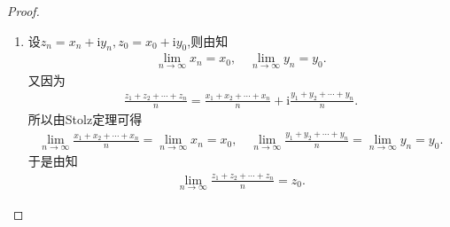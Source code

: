 \documentclass[../../main.tex]{subfiles}%
\begin{document}
\begin{proof}
\begin{enumerate}[(1)]
\item 设$z_n=x_n+\mathrm{i}y_n,z_0=x_0+\mathrm{i}y_0$,则由知
\begin{align*}
\lim\limits_{n\rightarrow \infty}x_n=x_0,\quad \lim\limits_{n\rightarrow \infty}y_n=y_0.
\end{align*}
又因为
\begin{align*}
\frac{z_1+z_2+\cdots +z_n}{n}=\frac{x_1+x_2+\cdots +x_n}{n}+\mathrm{i}\frac{y_1+y_2+\cdots +y_n}{n}.
\end{align*}
所以由Stolz定理可得
\begin{align*}
\lim\limits_{n\rightarrow \infty}\frac{x_1+x_2+\cdots +x_n}{n}=\lim\limits_{n\rightarrow \infty}x_n=x_0,\quad \lim\limits_{n\rightarrow \infty}\frac{y_1+y_2+\cdots +y_n}{n}=\lim\limits_{n\rightarrow \infty}y_n=y_0.
\end{align*}
于是由知
\begin{align*}
\lim\limits_{n\rightarrow \infty}\frac{z_1+z_2+\cdots +z_n}{n}=z_0.
\end{align*}
\end{enumerate}

\end{proof}
\end{document}
